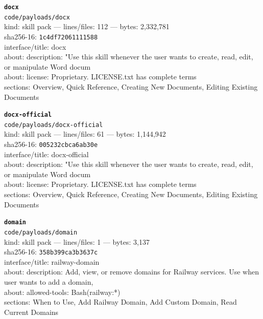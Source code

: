 \noindent\textbf{\texttt{docx}}\\
\texttt{code/payloads/docx}\\
kind: skill pack --- lines/files: 112 --- bytes: 2,332,781\\
sha256-16: \texttt{1c4df72061111588}\\
interface/title: docx\\
about: description: "Use this skill whenever the user wants to create, read, edit, or manipulate Word docum\\
about: license: Proprietary. LICENSE.txt has complete terms\\
sections: Overview, Quick Reference, Creating New Documents, Editing Existing Documents\\
\vspace*{6.0pt}
\newpage

\noindent\textbf{\texttt{docx-official}}\\
\texttt{code/payloads/docx-official}\\
kind: skill pack --- lines/files: 61 --- bytes: 1,144,942\\
sha256-16: \texttt{005232cbca6ab30e}\\
interface/title: docx-official\\
about: description: "Use this skill whenever the user wants to create, read, edit, or manipulate Word docum\\
about: license: Proprietary. LICENSE.txt has complete terms\\
sections: Overview, Quick Reference, Creating New Documents, Editing Existing Documents\\
\vspace*{6.0pt}

\noindent\textbf{\texttt{domain}}\\
\texttt{code/payloads/domain}\\
kind: skill pack --- lines/files: 1 --- bytes: 3,137\\
sha256-16: \texttt{358b399ca3b3637c}\\
interface/title: railway-domain\\
about: description: Add, view, or remove domains for Railway services. Use when user wants to add a domain,\\
about: allowed-tools: Bash(railway:*)\\
sections: When to Use, Add Railway Domain, Add Custom Domain, Read Current Domains\\
\vspace*{6.0pt}

